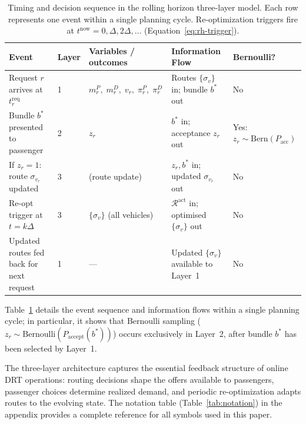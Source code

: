 \begin{table}[width=\textwidth,pos=t]
\centering
\caption{Timing and decision sequence in the rolling horizon three-layer model.
         Each row represents one event within a single planning cycle.
         Re-optimization triggers fire at $t^{\text{now}} = 0, \Delta, 2\Delta, \ldots$
         (Equation~\ref{eq:rh-trigger}).}
\label{tab:timing-diagram}
\footnotesize
\begin{tabular}{p{}lp{}p{}l}
\toprule
\textbf{Event} & \textbf{Layer} & \textbf{Variables / outcomes} & \textbf{Information Flow} & \textbf{Bernoulli?} \\
\midrule
Request $r$ arrives at $t_r^{\text{req}}$ &
  1 &
  $m_r^P,\; m_r^D,\; v_r,\; \pi_r^P,\; \pi_r^D$ &
  Routes $\{\sigma_v\}$ in; bundle $b^*$ out &
  No \\[4pt]
Bundle $b^*$ presented to passenger &
  2 &
  $z_r$ &
  $b^*$ in; acceptance $z_r$ out &
  Yes: $z_r \!\sim\! \mathrm{Bern}(P_{\text{acc}})$ \\[4pt]
If $z_r=1$: route $\sigma_{v_r}$ updated &
  3 &
  (route update) &
  $z_r, b^*$ in; updated $\sigma_{v_r}$ out &
  No \\[4pt]
Re-opt trigger at $t = k\Delta$ &
  3 &
  $\{\sigma_v\}$ (all vehicles) &
  $\mathcal{R}^{\text{act}}$ in; optimised $\{\sigma_v\}$ out &
  No \\[4pt]
Updated routes fed back for next request &
  1 &
  --- &
  Updated $\{\sigma_v\}$ available to Layer~1 &
  No \\
\bottomrule
\end{tabular}
\end{table}

Table~\ref{tab:timing-diagram} details the event sequence and information
flows within a single planning cycle; in particular, it shows that Bernoulli
sampling ($z_r \sim \mathrm{Bernoulli}(P_{\text{accept}}(b^*))$) occurs
exclusively in Layer~2, after bundle $b^*$ has been selected by Layer~1.

The three-layer architecture captures the essential feedback structure of online DRT
operations: routing decisions shape the offers available to passengers, passenger choices
determine realized demand, and periodic re-optimization adapts routes to the evolving
state. The notation table (Table~\ref{tab:notation}) in the appendix provides a complete
reference for all symbols used in this paper.
